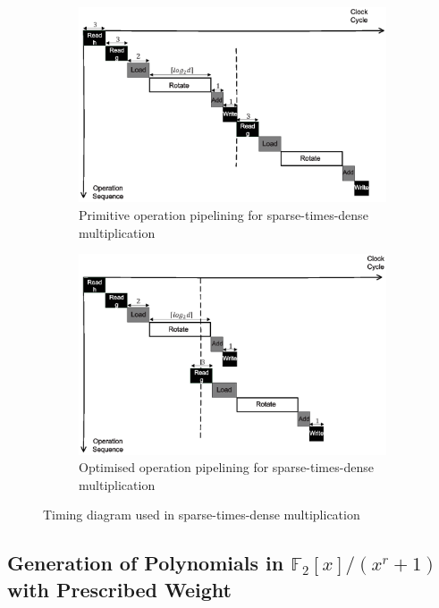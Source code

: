 \documentclass[runningheads]{llncs}
\begin{document}
\begin{figure}[!tb]
\centering
\begin{subfigure}[t]{0.47\textwidth}\centering
\includegraphics[width=\textwidth]{./fig/pipeline_mul.eps}
\caption{Primitive operation pipelining for sparse-times-dense multiplication}
\label{fig:pipeline_mul}
\end{subfigure}
\hspace{1em}
\begin{subfigure}[t]{0.47\textwidth}\centering
\includegraphics[width=\textwidth]{./fig/pipeline_mul2.eps}
\caption{Optimised operation pipelining for sparse-times-dense multiplication }
\label{fig:pipeline_mul2}
\end{subfigure}
\caption{Timing diagram used in sparse-times-dense multiplication}
\end{figure}

\subsection{Generation of Polynomials in $\mathbb{F}_2[x]/(x^r+1)$ with Prescribed Weight}
\end{document}
